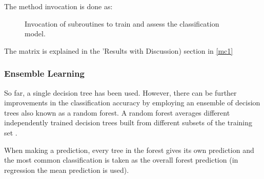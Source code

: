 The method invocation is done as:
\begin{figure}[H]
	\centering
	\caption{Invocation of subroutines to train and assess the classification model.}
	\label{fig:mim}
\end{figure}
The matrix is explained in the 'Results with Discussion) section in \ref{mc1}

\subsubsection{Ensemble Learning}
So far, a single decision tree has been used. However, there can be further improvements in the classification accuracy by employing an ensemble of decision trees also known as a random forest. A random forest averages different independently trained decision trees built from different subsets of the training set \parencite[89]{rebala_introduction_2019}. 

When making a prediction, every tree in the forest gives its own prediction and the most common classification is taken as the overall forest prediction (in regression the mean prediction is used).

